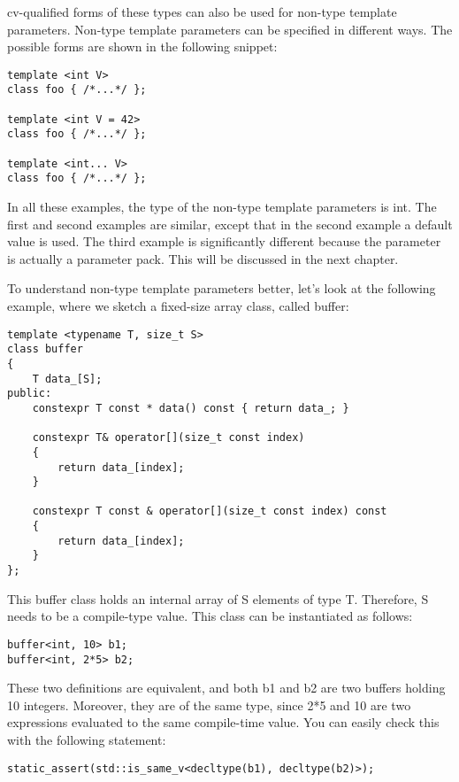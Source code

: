 cv-qualified forms of these types can also be used for non-type template parameters. Non-type template parameters can be specified in different ways. The possible forms are shown in the following snippet:

\begin{lstlisting}[style=styleCXX]
template <int V>
class foo { /*...*/ };

template <int V = 42>
class foo { /*...*/ };

template <int... V>
class foo { /*...*/ };
\end{lstlisting}

In all these examples, the type of the non-type template parameters is int. The first and second examples are similar, except that in the second example a default value is used. The third example is significantly different because the parameter is actually a parameter pack. This will be discussed in the next chapter.

To understand non-type template parameters better, let's look at the following example, where we sketch a fixed-size array class, called buffer:

\begin{lstlisting}[style=styleCXX]
template <typename T, size_t S>
class buffer
{
	T data_[S];
public:
	constexpr T const * data() const { return data_; }
	
	constexpr T& operator[](size_t const index)
	{
		return data_[index];
	}

	constexpr T const & operator[](size_t const index) const
	{
		return data_[index];
	}
};
\end{lstlisting}

This buffer class holds an internal array of S elements of type T. Therefore, S needs to be a compile-type value. This class can be instantiated as follows:

\begin{lstlisting}[style=styleCXX]
buffer<int, 10> b1;
buffer<int, 2*5> b2;
\end{lstlisting}

These two definitions are equivalent, and both b1 and b2 are two buffers holding 10 integers. Moreover, they are of the same type, since 2*5 and 10 are two expressions evaluated to the same compile-time value. You can easily check this with the following statement:

\begin{lstlisting}[style=styleCXX]
static_assert(std::is_same_v<decltype(b1), decltype(b2)>);
\end{lstlisting}

